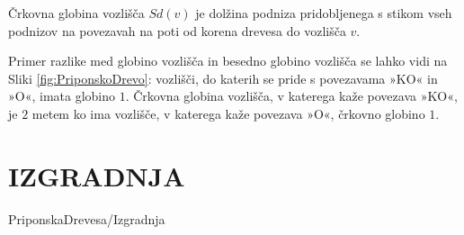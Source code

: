 \begin{defi}
    Črkovna globina vozlišča $Sd(v)$ je dolžina podniza pridobljenega s stikom vseh podnizov na povezavah na poti od korena drevesa do vozlišča $v$. 
\end{defi}

Primer razlike med globino vozlišča in besedno globino vozlišča se lahko vidi na Sliki \ref{fig:PriponskoDrevo}: vozlišči, do katerih se pride s povezavama »KO« in »O«, imata globino $1$. Črkovna globina vozlišča, v katerega kaže povezava »KO«, je $2$ metem ko ima vozlišče, v katerega kaže povezava »O«, črkovno globino $1$. 

\section{IZGRADNJA}\label{sec:izgradnja}
{PriponskaDrevesa/Izgradnja}
